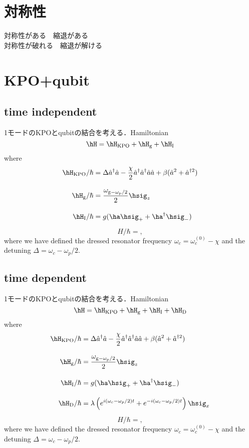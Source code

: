 \section{対称性}
対称性がある　縮退がある\\
対称性が破れる　縮退が解ける



\section{KPO+qubit}
\subsection{time independent}
1モードのKPOとqubitの結合を考える．Hamiltonian
\begin{equation}
    \hH=\hH_{\rm{KPO}}+\hH_{\rm{g}}+\hH_{\rm{I}}    
\end{equation}
where
\begin{align}
    \hH_{\rm{KPO}}/\hbar&=\Delta \hat{a}^\dagger\hat{a} - \frac{\chi}{2} \hat{a}^\dagger\hat{a}^\dagger\hat{a}\hat{a} + \beta (\hat{a}^2 + \hat{a}^{\dagger 2})\\[10pt]
    \hH_{\rm{g}}/\hbar&=\frac{\omega_{\rm{g}-\omega_{\rm{p}}/2}}{2}\hsig_z\\[10pt]
    \hH_{\rm{I}}/\hbar&=g(\ha\hsig_{+}+\ha^{\dag}\hsig_{-})
\end{align}
\begin{equation}
\hat{H}/\hbar = ,
\end{equation}
where we have defined the dressed resonator frequency $\omega_c=\omega_c^{(0)}-\chi$ and the detuning $\Delta = \omega_c - \omega_p/2$.


\subsection{time dependent}
1モードのKPOとqubitの結合を考える．Hamiltonian
\begin{equation}
    \hH=\hH_{\rm{KPO}}+\hH_{\rm{g}}+\hH_{\rm{I}}+\hH_{\rm{D}}    
\end{equation}
where
\begin{align}
    \hH_{\rm{KPO}}/\hbar&=\Delta \hat{a}^\dagger\hat{a} - \frac{\chi}{2} \hat{a}^\dagger\hat{a}^\dagger\hat{a}\hat{a} + \beta (\hat{a}^2 + \hat{a}^{\dagger 2})\\[10pt]
    \hH_{\rm{g}}/\hbar&=\frac{\omega_{\rm{g}-\omega_{\rm{p}}/2}}{2}\hsig_z\\[10pt]
    \hH_{\rm{I}}/\hbar&=g(\ha\hsig_{+}+\ha^{\dag}\hsig_{-})\\[10pt]
    \hH_{\rm{D}}/\hbar&=\lambda\left(e^{i(\omega_c-\omega_p/2)t}+e^{-i(\omega_c-\omega_p/2)t}\right)
    \hsig_x
\end{align}
\begin{equation}
\hat{H}/\hbar = ,
\end{equation}
where we have defined the dressed resonator frequency $\omega_c=\omega_c^{(0)}-\chi$ and the detuning $\Delta = \omega_c - \omega_p/2$.



